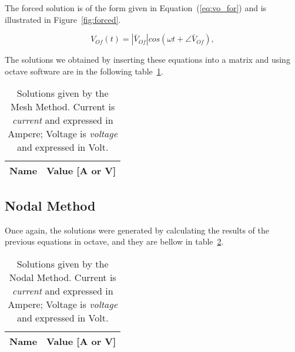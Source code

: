 The forced solution is of the form given in Equation~(\ref{eq:vo_for}) and is
illustrated in Figure~\ref{fig:forced}.

\begin{equation}
  V_{Of}(t) = |\bar{V}_{Of}| cos(\omega t + \angle \bar{V}_{Of}),
  \label{eq:vo_for}
\end{equation}

The solutions we obtained by inserting these equations into a matrix and using octave software are in the following table~\ref{tab:mesh}.

\begin{table}[h]
	\centering
	\begin{tabular}{|l|r|}
		\hline    
		{\bf Name} & {\bf Value [A or V]} \\ \hline
		
	\end{tabular}
	\caption{Solutions given by the Mesh Method. Current is {\em current}
		and expressed in Ampere; Voltage is {\it voltage} and expressed in
		Volt.}
	\label{tab:mesh}
\end{table}




\subsection{Nodal Method}

Once again, the solutions were generated by calculating the results of the previous equations in octave, and they are bellow in table~\ref{tab:nodal}.

\begin{table}[h]
	\centering
	\begin{tabular}{|l|r|}
		\hline    
		{\bf Name} & {\bf Value [A or V]} \\ \hline
		
	\end{tabular}
	\caption{Solutions given by the Nodal Method. Current is {\em current}
		and expressed in Ampere; Voltage is {\it voltage} and expressed in
		Volt.}
	\label{tab:nodal}
\end{table}


